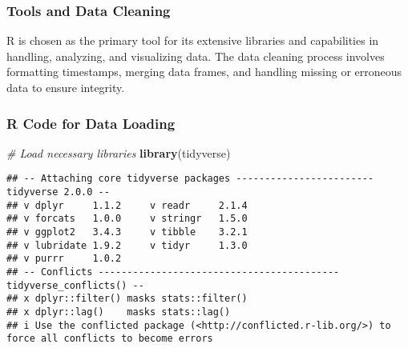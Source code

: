 \documentclass[
]{article}
\newenvironment{Shaded}{\begin{snugshade}}{\end{snugshade}}
\newcommand{\CommentTok}[1]{\textcolor[rgb]{0.56,0.35,0.01}{\textit{#1}}}
\newcommand{\FunctionTok}[1]{\textcolor[rgb]{0.13,0.29,0.53}{\textbf{#1}}}
\newcommand{\NormalTok}[1]{#1}
\begin{document}
\hypertarget{tools-and-data-cleaning}{%
\subsubsection{Tools and Data Cleaning}\label{tools-and-data-cleaning}}

R is chosen as the primary tool for its extensive libraries and
capabilities in handling, analyzing, and visualizing data. The data
cleaning process involves formatting timestamps, merging data frames,
and handling missing or erroneous data to ensure integrity.

\hypertarget{r-code-for-data-loading}{%
\subsubsection{R Code for Data Loading}\label{r-code-for-data-loading}}

\begin{Shaded}
\begin{Highlighting}[]
\CommentTok{\# Load necessary libraries}
\FunctionTok{library}\NormalTok{(tidyverse)}
\end{Highlighting}
\end{Shaded}

\begin{verbatim}
## -- Attaching core tidyverse packages ------------------------ tidyverse 2.0.0 --
## v dplyr     1.1.2     v readr     2.1.4
## v forcats   1.0.0     v stringr   1.5.0
## v ggplot2   3.4.3     v tibble    3.2.1
## v lubridate 1.9.2     v tidyr     1.3.0
## v purrr     1.0.2     
## -- Conflicts ------------------------------------------ tidyverse_conflicts() --
## x dplyr::filter() masks stats::filter()
## x dplyr::lag()    masks stats::lag()
## i Use the conflicted package (<http://conflicted.r-lib.org/>) to force all conflicts to become errors
\end{verbatim}
\end{document}
